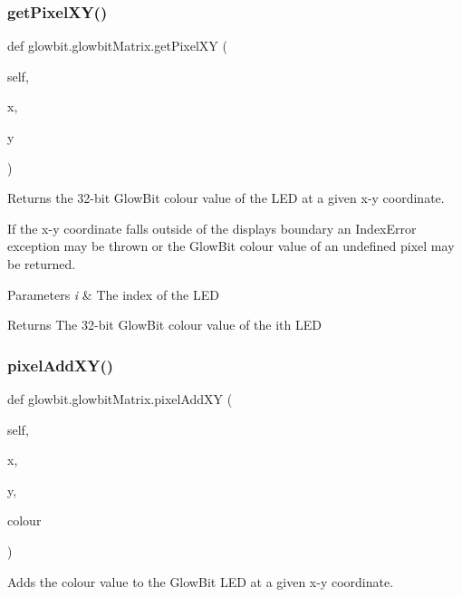 \subsubsection{\texorpdfstring{get\+Pixel\+X\+Y()}{getPixelXY()}}
{\footnotesize\ttfamily def glowbit.\+glowbit\+Matrix.\+get\+Pixel\+XY (\begin{DoxyParamCaption}\item[{}]{self,  }\item[{}]{x,  }\item[{}]{y }\end{DoxyParamCaption})}



Returns the 32-\/bit Glow\+Bit colour value of the L\+ED at a given x-\/y coordinate. 

If the x-\/y coordinate falls outside of the display\textquotesingle{}s boundary an Index\+Error exception may be thrown or the Glow\+Bit colour value of an undefined pixel may be returned.


\begin{DoxyParams}{Parameters}
{\em i} & The index of the L\+ED \\
\hline
\end{DoxyParams}
\begin{DoxyReturn}{Returns}
The 32-\/bit Glow\+Bit colour value of the i\textquotesingle{}th L\+ED 
\end{DoxyReturn}
\mbox{\label{classglowbit_1_1glowbitMatrix_ae05d008c207c5f5219e737d29185501e}} 
\subsubsection{\texorpdfstring{pixel\+Add\+X\+Y()}{pixelAddXY()}}
{\footnotesize\ttfamily def glowbit.\+glowbit\+Matrix.\+pixel\+Add\+XY (\begin{DoxyParamCaption}\item[{}]{self,  }\item[{}]{x,  }\item[{}]{y,  }\item[{}]{colour }\end{DoxyParamCaption})}



Adds the colour value to the Glow\+Bit L\+ED at a given x-\/y coordinate. 

